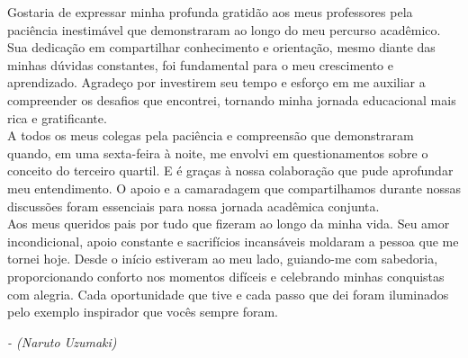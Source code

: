 \documentclass[
	12pt,			%
	openany,		%
	oneside,		%
	a4paper,		%
	english,		%
	brazil			%
	]{abntex2}
\begin{document}
\begin{agradecimentos}
  
	Gostaria de expressar minha profunda gratidão aos meus professores pela paciência inestimável que demonstraram ao longo do meu percurso acadêmico. Sua dedicação em compartilhar conhecimento e orientação, mesmo diante das minhas dúvidas constantes, foi fundamental para o meu crescimento e aprendizado. Agradeço por investirem seu tempo e esforço em me auxiliar a compreender os desafios que encontrei, tornando minha jornada educacional mais rica e gratificante.\\
	A todos os meus colegas pela paciência e compreensão que demonstraram quando, em uma sexta-feira à noite, me envolvi em questionamentos sobre o conceito do terceiro quartil. E é graças à nossa colaboração que pude aprofundar meu entendimento. O apoio e a camaradagem que compartilhamos durante nossas discussões foram essenciais para nossa jornada acadêmica conjunta.\\
	Aos meus queridos pais por tudo que fizeram ao longo da minha vida. Seu amor incondicional, apoio constante e sacrifícios incansáveis moldaram a pessoa que me tornei hoje. Desde o início estiveram ao meu lado, guiando-me com sabedoria, proporcionando conforto nos momentos difíceis e celebrando minhas conquistas com alegria. Cada oportunidade que tive e cada passo que dei foram iluminados pelo exemplo inspirador que vocês sempre foram.

\end{agradecimentos}

\begin{epigrafe}
   \vspace*{\fill}
   \begin{flushright}
	\textit{ - (Naruto Uzumaki)}
   \end{flushright}
\end{epigrafe}

\setlength{\absparsep}{18pt} %
\end{document}
